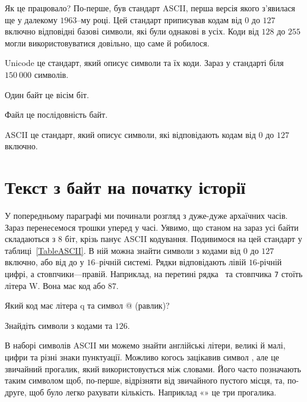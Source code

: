 Як це працювало?
По-перше, був стандарт ASCII, перша версія якого з'явилася ще у далекому $1963$--му році.
Цей стандарт приписував кодам від $0$ до $127$ включно відповідні базові символи, які були однакові в усіх.
Коди від $128$ до $255$ могли використовуватися довільно, що саме й робилося.

\begin{summary}
\item Unicode це стандарт, який описує символи та їх коди. Зараз у стандарті біля $150~000$ символів.
\item Один байт це вісім біт.
\item Файл це послідовність байт.
\item ASCII це стандарт, який описує символи, які відповідають кодам від $0$ до $127$ включно.
\end{summary}

\section{Текст з байт на початку історії}

У попередньому параграфі ми починали розгляд з дуже-дуже архаїчних часів.
Зараз перенесемося трошки уперед у часі.
Уявимо, що станом на зараз усі байти складаються з $8$ біт, крізь панує ASCII кодування.
Подивимося на цей стандарт у таблиці~\ref{TableASCII}.
В ній можна знайти символи з кодами від $0$ до $127$ включно, або від  до  у $16$--річній системі.
Рядки відповідають лівій $16$-річній цифрі, а стовпчики---правій.
Наприклад, на перетині рядка \ та стовпчика \texttt{7} стоїть літера \chr W.
Вона має код  або $87$.



\begin{exercise}
Який код має літера \chr q та символ \chr @ (равлик)?
\end{exercise}

\begin{exercise}
Знайдіть символи з кодами  та $126$.
\end{exercise}

В наборі символів ASCII ми можемо знайти англійські літери, великі й малі, цифри та різні знаки пунктуації.
Можливо когось зацікавив символ \chspace, але це звичайний прогалик, який використовується між словами.
Його часто позначають таким символом щоб, по-перше, відрізняти від звичайного пустого місця, та, по-друге, щоб було легко рахувати кількість.
Наприклад «\texttt{\s\s\s}» це три прогалика.

